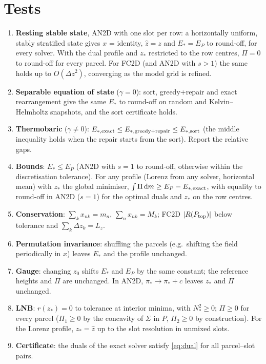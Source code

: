 \documentclass[11pt,a4paper]{article}
\newcommand{\Ptop}{P_{\rm top}}
\newcommand{\zs}{z_{*}}
\newcommand{\zh}{\hat z}
\begin{document}
\section{Tests}\label{sec:tests}
\begin{enumerate}
  \item \textbf{Resting stable state}, AN2D with one slot per row: a horizontally uniform, stably stratified state gives
        $x$ = identity, $\zh=z$ and $E_*=E_P$ to round-off, for every solver. With the dual profile and $\zs$ restricted to
        the row centres, $\Pi=0$ to round-off for every parcel. For FC2D (and AN2D with $s>1$) the same holds up to
        $O(\Delta z^2)$, converging as the model grid is refined.
  \item \textbf{Separable equation of state} ($\gamma=0$): sort, greedy+repair and exact rearrangement give the same $E_*$ to
        round-off on random and Kelvin--Helmholtz snapshots, and the sort certificate holds.
  \item \textbf{Thermobaric} ($\gamma\neq0$): $E_{*,\rm exact}\le E_{*,\rm greedy+repair}\le E_{*,\rm sort}$ (the middle
        inequality holds when the repair starts from the sort). Report the relative gaps.
  \item \textbf{Bounds}: $E_*\le E_P$ (AN2D with $s=1$ to round-off, otherwise within the discretisation tolerance). For any
        profile (Lorenz from any solver, horizontal mean) with $\zs$ the global minimiser, $\int\Pi\,\mathrm{d}m\ge
        E_P-E_{*,\rm exact}$, with equality to round-off in AN2D ($s=1$) for the optimal duals and $\zs$ on the row centres.
  \item \textbf{Conservation}: $\sum_kx_{nk}=m_n$, $\sum_nx_{nk}=M_k$; FC2D $|R(\Ptop)|$ below tolerance and
        $\sum_k\Delta z_k=L_z$.
  \item \textbf{Permutation invariance}: shuffling the parcels (e.g.\ shifting the field periodically in $x$) leaves $E_*$
        and the profile unchanged.
  \item \textbf{Gauge}: changing $z_0$ shifts $E_*$ and $E_P$ by the same constant; the reference heights and $\Pi$ are
        unchanged. In AN2D, $\pi_*\to\pi_*+c$ leaves $\zs$ and $\Pi$ unchanged.
  \item \textbf{LNB}: $r(\zs)=0$ to tolerance at interior minima, with $N_*^2\ge0$; $\Pi\ge0$ for every parcel ($\Pi_1\ge0$
        by the concavity of $\Sigma$ in $P$, $\Pi_2\ge0$ by construction). For the Lorenz profile, $\zs=\zh$ up to the slot
        resolution in unmixed slots.
  \item \textbf{Certificate}: the duals of the exact solver satisfy \eqref{eq:dual} for all parcel--slot pairs.

\end{enumerate}
\end{document}
